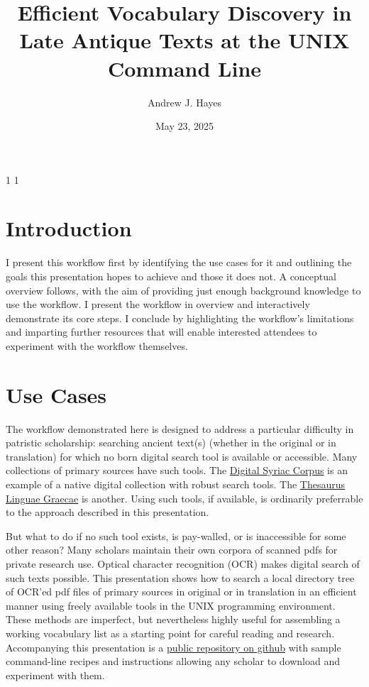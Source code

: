 \documentclass[
  letterpaper,
]{tufte-handout}
\title{Efficient Vocabulary Discovery in Late Antique Texts at the UNIX
Command Line}
\author{Andrew J. Hayes}
\date{May 23, 2025}
\begin{document}
\maketitle

\ifdefined\soulregister

\soulregister\MakeTextUppercase{1} \soulregister\MakeTextLowercase{1}
\soulregister{} \fi

\section{Introduction}\label{introduction}

I present this workflow first by identifying the use cases for it and
outlining the goals this presentation hopes to achieve and those it does
not. A conceptual overview follows, with the aim of providing just
enough background knowledge to use the workflow. I present the workflow
in overview and interactively demonstrate its core steps. I conclude by
highlighting the workflow's limitations and imparting further resources
that will enable interested attendees to experiment with the workflow
themselves.

\section{Use Cases}\label{use-cases}

The workflow demonstrated here is designed to address a particular
difficulty in patristic scholarship: searching ancient text(s) (whether
in the original or in translation) for which no born digital search tool
is available or accessible. Many collections of primary sources have
such tools. The \href{https://syriaccorpus.org/index.html}{Digital
Syriac Corpus} is an example of a native digital collection with robust
search tools. The \href{https://stephanus.tlg.uci.edu}{Thesaurus Linguae
Graecae} is another. Using such tools, if available, is ordinarily
preferrable to the approach described in this presentation.

But what to do if no such tool exists, is pay-walled, or is inaccessible
for some other reason? Many scholars maintain their own corpora of
scanned pdfs for private research use. Optical character recognition
(OCR) makes digital search of such texts possible. This presentation
shows how to search a local directory tree of OCR'ed pdf files of
primary sources in original or in translation in an efficient manner
using freely available tools in the UNIX programming environment. These
methods are imperfect, but nevertheless highly useful for assembling a
working vocabulary list as a starting point for careful reading and
research. Accompanying this presentation is a
\href{==insert\%20link==}{public repository on github} with sample
command-line recipes and instructions allowing any scholar to download
and experiment with them.
\end{document}
